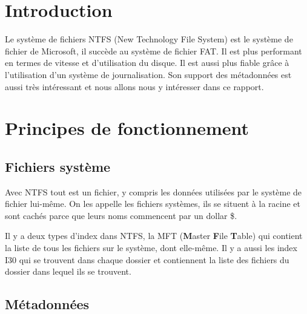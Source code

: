 \documentclass[a4paper]{article}
\begin{document}
\let\cleardoublepage\clearpage










\section{Introduction}

Le système de fichiers NTFS (New Technology File System) est le système de fichier de Microsoft, il succède au système de fichier FAT. Il est plus performant en termes de vitesse et d'utilisation du disque. Il est aussi plus fiable grâce à l'utilisation d'un système de journalisation. Son support des métadonnées est aussi très intéressant et nous allons nous y intéresser dans ce rapport.










\section{Principes de fonctionnement}



\subsection{Fichiers système}

Avec NTFS tout est un fichier, y compris les données utilisées par le système de fichier lui-même. On les appelle les fichiers systèmes, ils se situent à la racine et sont cachés parce que leurs noms commencent par un dollar \$.

Il y a deux types d'index dans NTFS, la MFT (\textbf{M}aster \textbf{F}ile \textbf{T}able) qui contient la liste de tous les fichiers sur le système, dont elle-même. Il y a aussi les index I30 qui se trouvent dans chaque dossier et contiennent la liste des fichiers du dossier dans lequel ils se trouvent. 



\subsection{Métadonnées}
\end{document}
